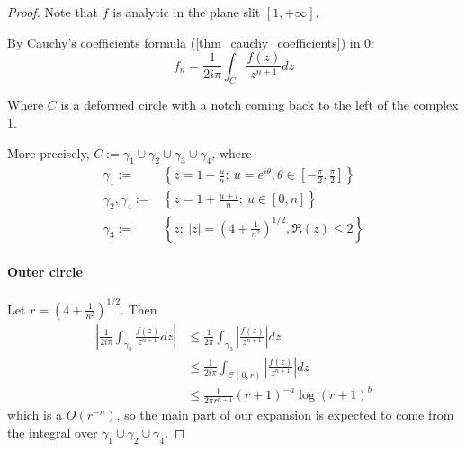\documentclass[../main.tex]{subfiles}
\begin{document}
\begin{proof}
	Note that $f$ is analytic in the plane slit $[1, +\infty]$.

	By Cauchy's coefficients formula (\ref{thm_cauchy_coefficients}) in 0:
	\[
	f_n = \frac{1}{2i\pi} \int_{C} \frac{f(z)}{z^{n+1}} dz
	\]
	
	Where $C$ is a deformed circle with a notch coming back to the left of the complex 1.
	
	
	More precisely, $C := \gamma_1 \cup \gamma_2 \cup \gamma_3 \cup \gamma_4$, where
	\begin{align*}
		\gamma_1 := &\left\{ {{z = 1 - \frac{u}{n}} ;~ {u = e^{i \theta}, \theta \in \left[- \frac{\pi}{2}, \frac{\pi}{2} \right]}} \right\}\\
		\gamma_2, \gamma_4 := &\left\{ z = 1 + \frac{u \pm i}{n} ;~ u \in [0, n] \right\}\\
		\gamma_3 := &\left\{ z ;~ |z| = {\left(4 + \frac{1}{n^2}\right)}^{1/2}, \Re(z) \leq 2 \right\}
	\end{align*}
	
	\paragraph{Outer circle}
	Let $r = {\left(4 + \frac{1}{n^2}\right)}^{1/2}$. Then 
	\begin{align*}
		\left| \frac{1}{2i\pi} \int_{\gamma_3} \frac{f(z)}{z^{n+1}} dz \right|
		&\leq \frac{1}{2\pi} \int_{\gamma_3} \left| \frac{f(z)}{z^{n+1}} \right| dz \\
		&\leq \frac{1}{2i\pi} \int_{\mathcal{C}(0, r)} \left| \frac{f(z)}{z^{n+1}} \right| dz\\
		& \leq \frac{1}{2 \pi r^{n + 1}} {(r + 1)}^{-a} {\log (r + 1)}^b
	\end{align*}
	which is a $O(r^{-n})$, so the main part of our expansion is expected to come from the integral over $\gamma_1 \cup \gamma_2 \cup \gamma_4$.
	
	

\end{proof}
\end{document}
